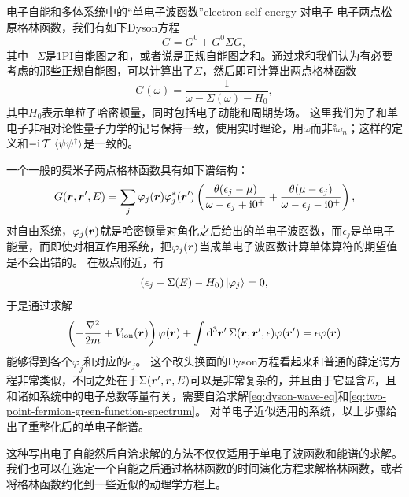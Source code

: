 \begin{back}{电子自能和多体系统中的“单电子波函数”}{electron-self-energy}
    对电子-电子两点松原格林函数，我们有如下Dyson方程
    \begin{equation}
        G  = G^{0} + G^0 \Sigma G,
    \end{equation}
    其中$-\Sigma$是1PI自能图之和，或者说是正规自能图之和。通过求和我们认为有必要考虑的那些正规自能图，可以计算出了$\Sigma$，然后即可计算出两点格林函数
    \[
        G(\omega) = \frac{1}{\omega - \Sigma(\omega) - H_0},
    \]
    其中$H_0$表示单粒子哈密顿量，同时包括电子动能和周期势场。
    这里我们为了和单电子非相对论性量子力学的记号保持一致，使用实时理论，用$\omega$而非$\ii \omega_n$；这样的定义和$- \mathrm{i} \operatorname{\mathcal{T}} \expval*{\psi \psi^\dagger}$是一致的。

    一个一般的费米子两点格林函数具有如下谱结构：
    \begin{equation}
        G(\vb*{r}, \vb*{r}', E) = \sum_{j} \varphi_j(\vb*{r}) \varphi_j^*(\vb*{r}') \left( \frac{\theta(\epsilon_j - \mu)}{\omega - \epsilon_j + \mathrm{i} 0^+} + \frac{\theta(\mu - \epsilon_j)}{\omega - \epsilon_j - \mathrm{i} 0^+} \right),
        \label{eq:two-point-fermion-green-function-spectrum}
    \end{equation}
    对自由系统，$\varphi_j(\vb*{r})$就是哈密顿量对角化之后给出的单电子波函数，而$\epsilon_j$是单电子能量，而即使对相互作用系统，把$\varphi_j(\vb*{r})$当成单电子波函数计算单体算符的期望值是不会出错的。
    在极点附近，有
    \[
        (\epsilon_j - \Sigma(E) - H_0) \ket{\varphi_j} = 0, 
    \]
    于是通过求解
    \begin{equation}
        \left( - \frac{\laplacian}{2m} + V_\text{ion}(\vb*{r}) \right) \varphi(\vb*{r}) + \int \dd[3]{\vb*{r}'} \Sigma(\vb*{r}, \vb*{r}', \epsilon) \varphi(\vb*{r}') = \epsilon \varphi(\vb*{r})
        \label{eq:dyson-wave-eq}
    \end{equation}
    能够得到各个$\varphi_j$和对应的$\epsilon_j$。
    这个改头换面的Dyson方程看起来和普通的薛定谔方程非常类似，不同之处在于$\Sigma(\vb*{r}', \vb*{r}, E)$可以是非常复杂的，并且由于它显含$E$，且和诸如系统中的电子总数等量有关，需要自洽求解\eqref{eq:dyson-wave-eq}和\eqref{eq:two-point-fermion-green-function-spectrum}。
    对单电子近似适用的系统，以上步骤给出了重整化后的单电子能谱。

    这种写出电子自能然后自洽求解的方法不仅仅适用于单电子波函数和能谱的求解。
    我们也可以在选定一个自能之后通过格林函数的时间演化方程求解格林函数，或者将格林函数约化到一些近似的动理学方程上。
\end{back}


